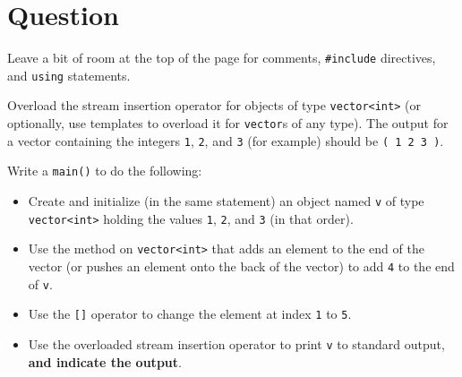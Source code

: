 \newEvenPage

\section{Question}

Leave a bit of room at the top of the page for comments,
\texttt{#include} directives, and \texttt{using} statements.

Overload the stream insertion operator for objects of type
\texttt{vector<int>} (or optionally, use templates to overload it for
\texttt{vector}s of any type).  The output for a vector containing the
integers \texttt{1}, \texttt{2}, and \texttt{3} (for
example) should be \texttt{( 1 2 3 )}.

Write a \texttt{main()} to do the following:
\begin{itemize}
  \item Create and initialize (in the same statement) an object named
    \texttt{v} of type \texttt{vector<int>} holding the
    values \texttt{1}, \texttt{2}, and \texttt{3}
    (in that order).
  \item Use the method on \texttt{vector<int>} that adds an element to
    the end of the vector (or pushes an element onto the back of the vector) to
    add \texttt{4} to the end of \texttt{v}.
  \item Use the \texttt{[]} operator to change the element at index
    \texttt{1} to \texttt{5}.
  \item Use the overloaded stream insertion operator to print
    \texttt{v} to standard output, \textbf{and indicate the output}.
\end{itemize}

\newOddPage
\textQuestion{\makePageQuadrilleRuled}

\newpage

